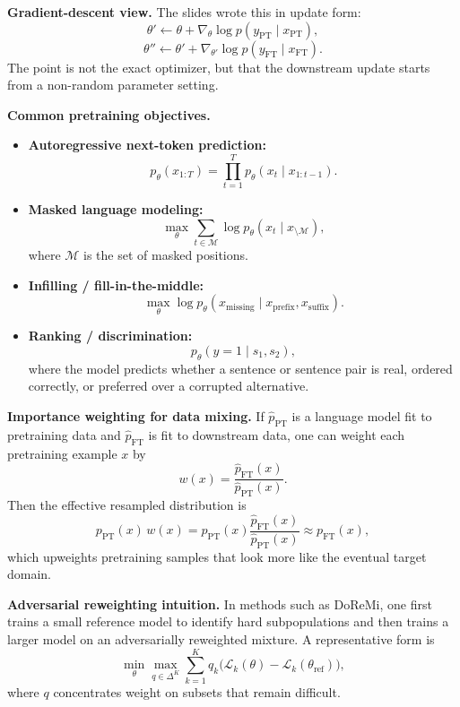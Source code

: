 \documentclass[11pt]{article}
\begin{document}
\textbf{Gradient-descent view.} The slides wrote this in update form:
\[
\theta' \leftarrow \theta + \nabla_{\theta}\log p(y_{\mathrm{PT}} \mid x_{\mathrm{PT}}),
\]
\[
\theta'' \leftarrow \theta' + \nabla_{\theta'}\log p(y_{\mathrm{FT}} \mid x_{\mathrm{FT}}).
\]
The point is not the exact optimizer, but that the downstream update starts from a non-random parameter setting.

\textbf{Common pretraining objectives.}
\begin{itemize}
    \item \textbf{Autoregressive next-token prediction:}
    \[
    p_{\theta}(x_{1:T}) = \prod_{t=1}^{T} p_{\theta}(x_t \mid x_{1:t-1}).
    \]
    \item \textbf{Masked language modeling:}
    \[
    \max_{\theta} \sum_{t \in \mathcal{M}} \log p_{\theta}(x_t \mid x_{\setminus \mathcal{M}}),
    \]
    where \(\mathcal{M}\) is the set of masked positions.
    \item \textbf{Infilling / fill-in-the-middle:}
    \[
    \max_{\theta}\log p_{\theta}(x_{\mathrm{missing}} \mid x_{\mathrm{prefix}}, x_{\mathrm{suffix}}).
    \]
    \item \textbf{Ranking / discrimination:}
    \[
    p_{\theta}(y=1 \mid s_1, s_2),
    \]
    where the model predicts whether a sentence or sentence pair is real, ordered correctly, or preferred over a corrupted alternative.
\end{itemize}

\textbf{Importance weighting for data mixing.} If \(\hat{p}_{\mathrm{PT}}\) is a language model fit to pretraining data and \(\hat{p}_{\mathrm{FT}}\) is fit to downstream data, one can weight each pretraining example \(x\) by
\[
w(x) = \frac{\hat{p}_{\mathrm{FT}}(x)}{\hat{p}_{\mathrm{PT}}(x)}.
\]
Then the effective resampled distribution is
\[
p_{\mathrm{PT}}(x)\, w(x)
=
p_{\mathrm{PT}}(x)\frac{\hat{p}_{\mathrm{FT}}(x)}{\hat{p}_{\mathrm{PT}}(x)}
\approx
p_{\mathrm{FT}}(x),
\]
which upweights pretraining samples that look more like the eventual target domain.

\textbf{Adversarial reweighting intuition.} In methods such as DoReMi, one first trains a small reference model to identify hard subpopulations and then trains a larger model on an adversarially reweighted mixture. A representative form is
\[
\min_{\theta}\max_{q \in \Delta^K}
\sum_{k=1}^{K} q_k \big(\mathcal{L}_k(\theta) - \mathcal{L}_k(\theta_{\mathrm{ref}})\big),
\]
where \(q\) concentrates weight on subsets that remain difficult.
\end{document}
